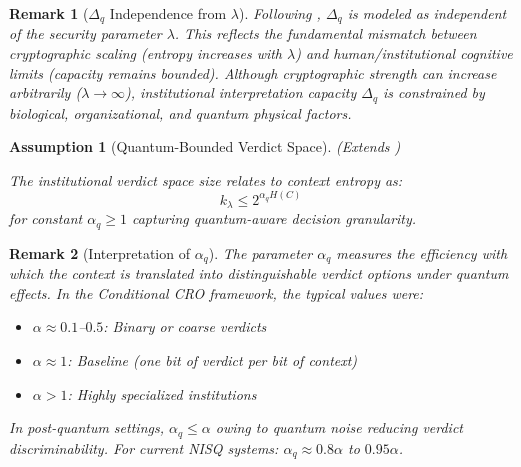 \documentclass{ieeeaccess}
\newtheorem{remark}{Remark}[section]
\newtheorem{assumption}{Assumption}[section]
\begin{document}
\begin{remark}[$\Delta_q$ Independence from $\lambda$]
Following \cite[Remark IV-A.2]{Minka2026CRO}, $\Delta_q$ is modeled as independent of the security parameter $\lambda$. This reflects the fundamental mismatch between cryptographic scaling (entropy increases with $\lambda$) and human/institutional cognitive limits (capacity remains bounded). Although cryptographic strength can increase arbitrarily ($\lambda \to \infty$), institutional interpretation capacity $\Delta_q$ is constrained by biological, organizational, and quantum physical factors.
\end{remark}

\begin{assumption}[Quantum-Bounded Verdict Space]
\label{ass:qverdict}
\textit{(Extends \cite[Assumption IV-A.2]{Minka2026CRO})}

The institutional verdict space size relates to context entropy as:
\begin{equation}
    k_\lambda \leq 2^{\alpha_q H(C)}
\end{equation}
for constant $\alpha_q \geq 1$ capturing quantum-aware decision granularity.
\end{assumption}

\begin{remark}[Interpretation of $\alpha_q$]
The parameter $\alpha_q$ measures the efficiency with which the context is translated into distinguishable verdict options under quantum effects. In the Conditional CRO framework, the typical values were:
\begin{itemize}
    \item $\alpha \approx 0.1$--$0.5$: Binary or coarse verdicts
    \item $\alpha \approx 1$: Baseline (one bit of verdict per bit of context)
    \item $\alpha > 1$: Highly specialized institutions
\end{itemize}

In post-quantum settings, $\alpha_q \leq \alpha$ owing to quantum noise reducing verdict discriminability. For current NISQ systems: $\alpha_q \approx 0.8 \alpha$ to $0.95 \alpha$.
\end{remark}
\end{document}
